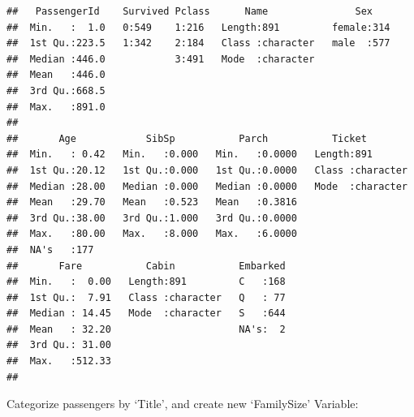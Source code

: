 \documentclass[]{article}
\begin{document}
\begin{verbatim}
##   PassengerId    Survived Pclass      Name               Sex     
##  Min.   :  1.0   0:549    1:216   Length:891         female:314  
##  1st Qu.:223.5   1:342    2:184   Class :character   male  :577  
##  Median :446.0            3:491   Mode  :character               
##  Mean   :446.0                                                   
##  3rd Qu.:668.5                                                   
##  Max.   :891.0                                                   
##                                                                  
##       Age            SibSp           Parch           Ticket         
##  Min.   : 0.42   Min.   :0.000   Min.   :0.0000   Length:891        
##  1st Qu.:20.12   1st Qu.:0.000   1st Qu.:0.0000   Class :character  
##  Median :28.00   Median :0.000   Median :0.0000   Mode  :character  
##  Mean   :29.70   Mean   :0.523   Mean   :0.3816                     
##  3rd Qu.:38.00   3rd Qu.:1.000   3rd Qu.:0.0000                     
##  Max.   :80.00   Max.   :8.000   Max.   :6.0000                     
##  NA's   :177                                                        
##       Fare           Cabin           Embarked  
##  Min.   :  0.00   Length:891         C   :168  
##  1st Qu.:  7.91   Class :character   Q   : 77  
##  Median : 14.45   Mode  :character   S   :644  
##  Mean   : 32.20                      NA's:  2  
##  3rd Qu.: 31.00                                
##  Max.   :512.33                                
## 
\end{verbatim}

Categorize passengers by `Title', and create new `FamilySize' Variable:
\end{document}
